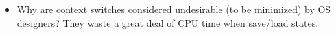\documentclass[fontsize=5pt]{scrartcl}
\begin{document}
\begin{multicols}{3}
\begin{itemize}
          \item Why are context switches considered undesirable (to be minimized) by OS designers? They waste a great deal of CPU time when save/load states.



      \end{itemize}
  \end{multicols}
\end{document}

